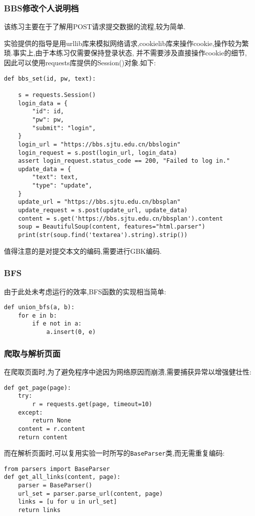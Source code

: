 \documentclass[a4paper]{article}
\begin{document}
            \subsubsection{BBS修改个人说明档}
该练习主要在于了解用POST请求提交数据的流程,较为简单.

实验提供的指导是用urllib库来模拟网络请求,cookielib库来操作cookie,操作较为繁琐.事实上,由于本练习仅需要保持登录状态,
并不需要涉及直接操作cookie的细节,因此可以使用requests库提供的Session()对象.如下:
\begin{verbatim}
def bbs_set(id, pw, text):

    s = requests.Session()
    login_data = {
        "id": id,
        "pw": pw,
        "submit": "login",
    }
    login_url = "https://bbs.sjtu.edu.cn/bbslogin"
    login_request = s.post(login_url, login_data)
    assert login_request.status_code == 200, "Failed to log in."
    update_data = {
        "text": text,
        "type": "update",
    }
    update_url = "https://bbs.sjtu.edu.cn/bbsplan"
    update_request = s.post(update_url, update_data)
    content = s.get('https://bbs.sjtu.edu.cn/bbsplan').content
    soup = BeautifulSoup(content, features="html.parser")
    print(str(soup.find('textarea').string).strip())
\end{verbatim}

值得注意的是对提交本文的编码,需要进行GBK编码.

            \subsubsection{BFS}
由于此处未考虑运行的效率,BFS函数的实现相当简单:
\begin{verbatim}
def union_bfs(a, b):
    for e in b:
        if e not in a:
            a.insert(0, e)
\end{verbatim}
            \subsubsection{爬取与解析页面}
在爬取页面时,为了避免程序中途因为网络原因而崩溃,需要捕获异常以增强健壮性:
\begin{verbatim}
def get_page(page):
    try:
        r = requests.get(page, timeout=10)
    except:
        return None
    content = r.content
    return content
\end{verbatim}

而在解析页面时,可以复用实验一时所写的\texttt{BaseParser}类,而无需重复编码:
\begin{verbatim}
from parsers import BaseParser
def get_all_links(content, page):
    parser = BaseParser()
    url_set = parser.parse_url(content, page)
    links = [u for u in url_set]
    return links
\end{verbatim}
\end{document}
